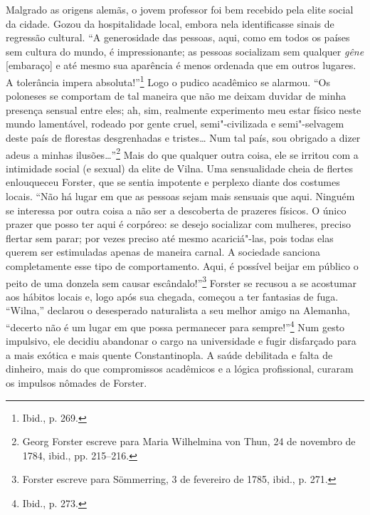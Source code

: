 Malgrado as origens alemãs, o jovem professor foi bem recebido pela
elite social da cidade. Gozou da hospitalidade local, embora nela
identificasse sinais de regressão cultural. ``A generosidade das
pessoas, aqui, como em todos os países sem cultura do mundo, é
impressionante; as pessoas socializam sem qualquer \emph{gêne}
{[}embaraço{]} e até mesmo sua aparência é menos ordenada que em outros
lugares. A tolerância impera absoluta!''\footnote{Ibid., p. 269.} Logo o
pudico acadêmico se alarmou. ``Os poloneses se comportam de tal maneira
que não me deixam duvidar de minha presença sensual entre eles; ah, sim,
realmente experimento meu estar físico neste mundo lamentável, rodeado
por gente cruel, semi"-civilizada e semi"-selvagem deste país de florestas
desgrenhadas e tristes\ldots{} Num tal país, sou obrigado a dizer adeus
a minhas ilusões\ldots{}''\footnote{Georg Forster escreve para Maria
  Wilhelmina von Thun, 24 de novembro de 1784, ibid., pp. 215--216.} Mais
do que qualquer outra coisa, ele se irritou com a intimidade social (e
sexual) da elite de Vilna. Uma sensualidade cheia de flertes enlouqueceu
Forster, que se sentia impotente e perplexo diante dos costumes locais.
``Não há lugar em que as pessoas sejam mais sensuais que aqui. Ninguém
se interessa por outra coisa a não ser a descoberta de prazeres físicos.
O único prazer que posso ter aqui é corpóreo: se desejo socializar com
mulheres, preciso flertar sem parar; por vezes preciso até mesmo
acariciá"-las, pois todas elas querem ser estimuladas apenas de maneira
carnal. A sociedade sanciona completamente esse tipo de comportamento.
Aqui, é possível beijar em público o peito de uma donzela sem causar
escândalo!''\footnote{Forster escreve para Sömmerring, 3 de fevereiro de
  1785, ibid., p. 271.} Forster se recusou a se acostumar aos hábitos
locais e, logo após sua chegada, começou a ter fantasias de fuga.
``Wilna,'' declarou o desesperado naturalista a seu melhor amigo na
Alemanha, ``decerto não é um lugar em que possa permanecer para
sempre!''\footnote{Ibid., p. 273.} Num gesto impulsivo, ele decidiu
abandonar o cargo na universidade e fugir disfarçado para a mais exótica
e mais quente Constantinopla. A saúde debilitada e falta de dinheiro,
mais do que compromissos acadêmicos e a lógica profissional, curaram os
impulsos nômades de Forster.

